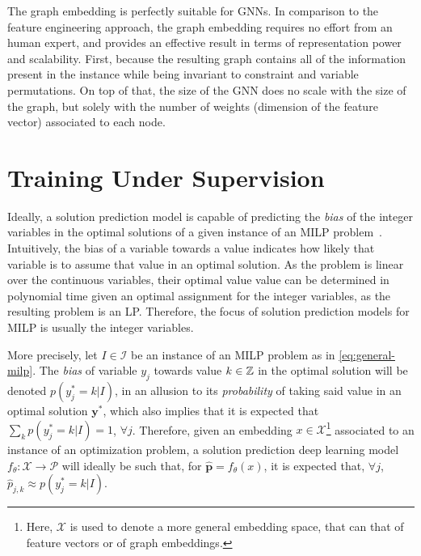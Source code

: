 The graph embedding is perfectly suitable for GNNs.
In comparison to the feature engineering approach, the graph embedding requires no effort from an human expert, and provides an effective result in terms of representation power and scalability.
First, because the resulting graph contains all of the information present in the instance while being invariant to constraint and variable permutations.
On top of that, the size of the GNN does no scale with the size of the graph, but solely with the number of weights (dimension of the feature vector) associated to each node.


\section{Training Under Supervision}\label{sec:training-solution-prediction}

Ideally, a solution prediction model is capable of predicting the \emph{bias} of the integer variables in the optimal solutions of a given instance of an MILP problem~\cite{khalilMIPGNNDataDrivenFramework2022}.
Intuitively, the bias of a variable towards a value indicates how likely that variable is to assume that value in an optimal solution.
As the problem is linear over the continuous variables, their optimal value value can be determined in polynomial time given an optimal assignment for the integer variables, as the resulting problem is an LP.
Therefore, the focus of solution prediction models for MILP is usually the integer variables.

More precisely, let $I\in \mathcal{I}$ be an instance of an MILP problem as in \eqref{eq:general-milp}.
The \emph{bias} of variable $y_j$ towards value $k\in \mathbb{Z}$ in the optimal solution will be denoted $p(y_j^*=k|I)$, in an allusion to its \emph{probability} of taking said value in an optimal solution $\bm{y}^*$, which also implies that it is expected that $\sum_{k} p(y_j^*=k|I) = 1$, $\forall j$.
Therefore, given an embedding $x\in \mathcal{X}$\footnote{Here, $\mathcal{X}$ is used to denote a more general embedding space, that can that of feature vectors or of graph embeddings.} associated to an instance of an optimization problem, a solution prediction deep learning model $f_{\theta}: \mathcal{X} \longrightarrow \mathcal{P}$ will ideally be such that, for $\hat{\bm{p}}=f_\theta(x)$, it is expected that, $\forall j$, $\hat{p}_{j,k}\approx p(y_j^*=k|I)$.

